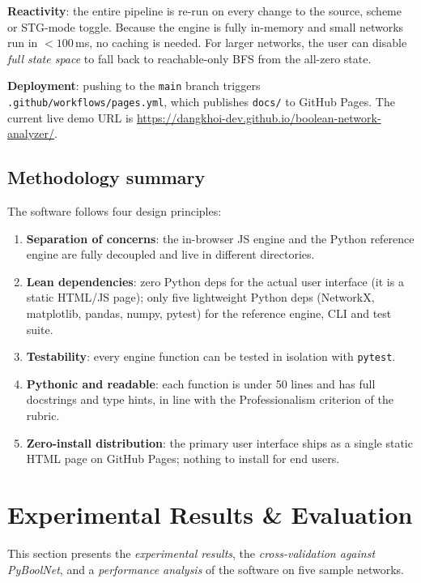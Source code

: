 \documentclass[oneside,final]{hcmut-report}
\begin{document}
\textbf{Reactivity}: the entire pipeline is re-run on every change to the source, scheme or STG-mode toggle. Because the engine is fully in-memory and small networks run in $< 100$\,ms, no caching is needed. For larger networks, the user can disable \textit{full state space} to fall back to reachable-only BFS from the all-zero state.

\textbf{Deployment}: pushing to the \texttt{main} branch triggers \texttt{.github/workflows/pages.yml}, which publishes \texttt{docs/} to GitHub Pages. The current live demo URL is \url{https://dangkhoi-dev.github.io/boolean-network-analyzer/}.

\subsection{Methodology summary}\label{subsec:method-summary}

The software follows four design principles:
\begin{enumerate}[leftmargin=*]
    \item \textbf{Separation of concerns}: the in-browser JS engine and the Python reference engine are fully decoupled and live in different directories.
    \item \textbf{Lean dependencies}: zero Python deps for the actual user interface (it is a static HTML/JS page); only five lightweight Python deps (NetworkX, matplotlib, pandas, numpy, pytest) for the reference engine, CLI and test suite.
    \item \textbf{Testability}: every engine function can be tested in isolation with \texttt{pytest}.
    \item \textbf{Pythonic and readable}: each function is under 50 lines and has full docstrings and type hints, in line with the Professionalism criterion of the rubric.
    \item \textbf{Zero-install distribution}: the primary user interface ships as a single static HTML page on GitHub Pages; nothing to install for end users.
\end{enumerate}

\section{Experimental Results \& Evaluation}\label{sec:experiment}

This section presents the \textit{experimental results}, the \textit{cross-validation against PyBoolNet}, and a \textit{performance analysis} of the software on five sample networks.
\end{document}
